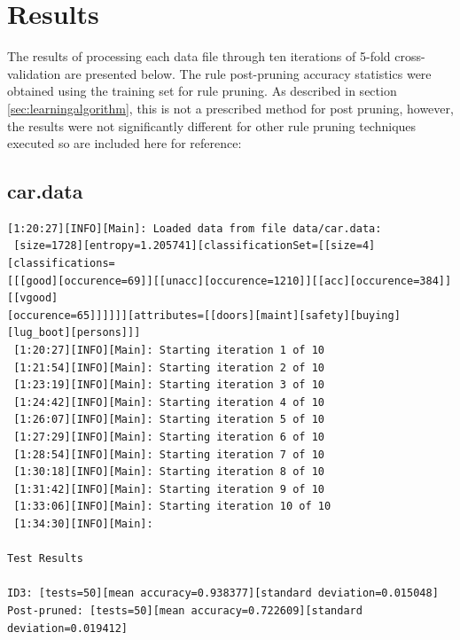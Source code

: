 \documentclass[10pt]{report}
\begin{document}
\section{Results}
\label{sec:results}
The results of processing each data file through ten iterations of
5-fold cross-validation are presented below. The rule post-pruning
accuracy statistics were obtained using the training set for rule
pruning. As described in section \ref{sec:learningalgorithm}, this is
not a prescribed method for post pruning, however, the results were
not significantly different for other rule pruning techniques executed
so are included here for reference:

\subsection*{car.data}
{\small
\begin{verbatim}
[1:20:27][INFO][Main]: Loaded data from file data/car.data:
 [size=1728][entropy=1.205741][classificationSet=[[size=4][classifications=
[[[good][occurence=69]][[unacc][occurence=1210]][[acc][occurence=384]][[vgood]
[occurence=65]]]]]][attributes=[[doors][maint][safety][buying][lug_boot][persons]]]
 [1:20:27][INFO][Main]: Starting iteration 1 of 10
 [1:21:54][INFO][Main]: Starting iteration 2 of 10
 [1:23:19][INFO][Main]: Starting iteration 3 of 10
 [1:24:42][INFO][Main]: Starting iteration 4 of 10
 [1:26:07][INFO][Main]: Starting iteration 5 of 10
 [1:27:29][INFO][Main]: Starting iteration 6 of 10
 [1:28:54][INFO][Main]: Starting iteration 7 of 10
 [1:30:18][INFO][Main]: Starting iteration 8 of 10
 [1:31:42][INFO][Main]: Starting iteration 9 of 10
 [1:33:06][INFO][Main]: Starting iteration 10 of 10
 [1:34:30][INFO][Main]:

Test Results

ID3: [tests=50][mean accuracy=0.938377][standard deviation=0.015048]
Post-pruned: [tests=50][mean accuracy=0.722609][standard deviation=0.019412]
\end{verbatim}
}
\end{document}
